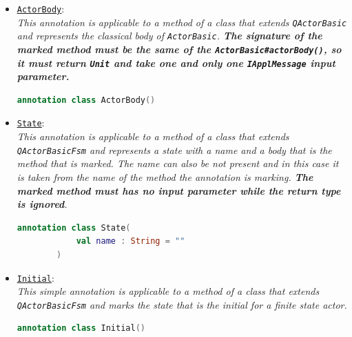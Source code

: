 \begin{itemize}
	\item \href{https://github.com/LM-96/QA-Extensions/blob/main/it.unibo.qakactor/src/main/kotlin/annotations/ActorBody.kt}{\textcolor{YellowOrange}{\underline{\texttt{ActorBody}}}}:\\
	\textit{This annotation is applicable to a method of a class that extends \texttt{QActorBasic} and represents the classical body of \texttt{ActorBasic}. \textbf{The signature of the marked method must be the same of the \texttt{ActorBasic\#actorBody()}, so it must return \texttt{Unit} and take one and only one \texttt{IApplMessage} input parameter.}}
	\begin{lstlisting}[numbers=none,language=Kotlin]
		annotation class ActorBody()
	\end{lstlisting}
	
	\item \href{https://github.com/LM-96/QA-Extensions/blob/main/it.unibo.qakactor/src/main/kotlin/annotations/State.kt}{\textcolor{YellowOrange}{\underline{\texttt{State}}}}:\\
	\textit{This annotation is applicable to a method of a class that extends \texttt{QActorBasicFsm} and represents a state with a name and a body that is the method that is marked. The name can also be not present and in this case it is taken from the name of the method the annotation is marking. \textbf{The marked method must has no input parameter while the return type is ignored}.}
	\begin{lstlisting}[numbers=none,language=Kotlin]
		annotation class State(
			val name : String = ""
		)
	\end{lstlisting}
	
	\item \href{https://github.com/LM-96/QA-Extensions/blob/main/it.unibo.qakactor/src/main/kotlin/annotations/State.kt}{\textcolor{YellowOrange}{\underline{\texttt{Initial}}}}:\\
	\textit{This simple annotation is applicable to a method of a class that extends \texttt{QActorBasicFsm} and marks the state that is the initial for a finite state actor.}
	\begin{lstlisting}[numbers=none,language=Kotlin]
		annotation class Initial()
	\end{lstlisting}
	

\end{itemize}

